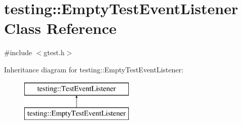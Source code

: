 \hypertarget{classtesting_1_1_empty_test_event_listener}{}\section{testing\+::Empty\+Test\+Event\+Listener Class Reference}
\label{classtesting_1_1_empty_test_event_listener}


{\ttfamily \#include $<$gtest.\+h$>$}

Inheritance diagram for testing\+::Empty\+Test\+Event\+Listener\+:\begin{figure}[H]
\begin{center}
\leavevmode
\includegraphics[height=2.000000cm]{classtesting_1_1_empty_test_event_listener}
\end{center}
\end{figure}
